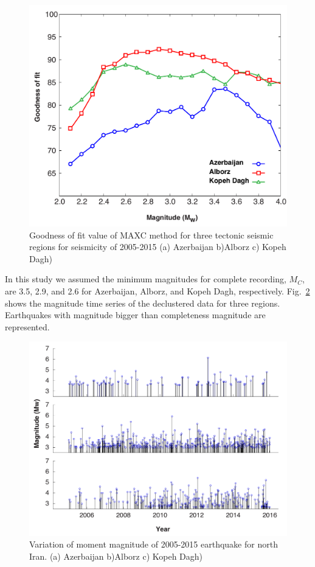 \begin{figure} [ht]
\centering
\includegraphics[scale=0.4]{figures/pdf/Figure03.pdf} 
\caption{Goodness of fit value of MAXC method for three tectonic seismic regions for seismicity of 2005-2015 (a) Azerbaijan b)Alborz c) Kopeh Dagh)}
\label{fig:completeness}
\end{figure} 





\noindent
In this study we assumed the minimum magnitudes for complete recording, $M_C$, are 3.5, 2.9, and 2.6 for Azerbaijan, Alborz, and Kopeh Dagh, respectively. Fig.~\ref{fig:mag-time} shows the magnitude time series of the declustered data for three regions. Earthquakes with magnitude bigger than completeness magnitude are represented. 

\begin{figure} [ht]
\centering
\includegraphics[scale=0.5]{figures/pdf/Figure04.pdf} 
\caption{Variation of moment magnitude of 2005-2015 earthquake for north Iran. (a) Azerbaijan b)Alborz c) Kopeh Dagh)}
\label{fig:mag-time}
\end{figure} 








